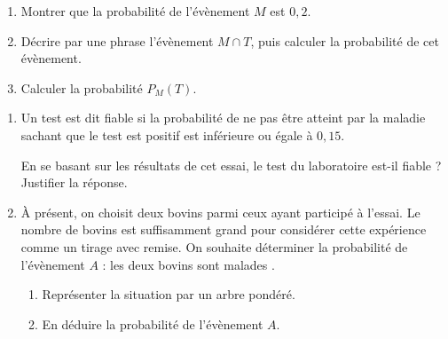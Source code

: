 \documentclass[10pt]{article}
\begin{document}
\begin{minipage}{0.7\linewidth}
	\begin{enumerate}
		\item Montrer que la probabilité de l'évènement $M$ est $0,2$.
		\item Décrire par une phrase l'évènement $M \cap T$, puis calculer la probabilité de cet évènement.
		\item Calculer la probabilité $P_M(T)$.
	\end{enumerate}
\end{minipage}
\hfill
{}
\begin{enumerate}[start=4]
	\item Un test est dit fiable si la probabilité de ne pas être atteint par la maladie sachant que le test est positif est inférieure ou égale à $0,15$.

	En se basant sur les résultats de cet essai, le test du laboratoire est-il fiable ? Justifier la réponse.
	\item À présent, on choisit deux bovins parmi ceux ayant participé à l'essai. Le nombre de bovins est suffisamment grand pour considérer cette expérience comme un tirage avec remise. On souhaite déterminer la probabilité de l'évènement $A$ : \og les deux bovins sont malades \fg.
	\begin{enumerate}
		\item Représenter la situation par un arbre pondéré.
		\item En déduire la probabilité de l'évènement $A$.
	\end{enumerate}
\end{enumerate}
\end{document}
